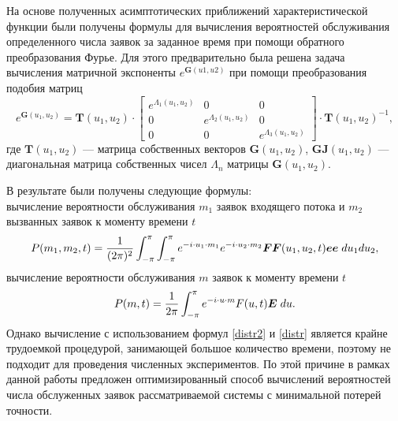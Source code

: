 На основе полученных асимптотических приближений характеристической функции были получены формулы для вычисления вероятностей обслуживания определенного числа заявок за заданное время при помощи обратного преобразования Фурье. Для этого предварительно была решена задача вычисления матричной экспоненты $e^{\boldsymbol{G}(u1,u2)}$ при помощи преобразования подобия матриц \cite{bronson1991matrix}
\begin{equation*}
	e^{\boldsymbol{G}(u_{1},u_{2})}=\boldsymbol{T}(u_{1},u_{2})\cdot \begin{bmatrix}
		e^{ \Lambda_{1}(u_{1},u_{2})} & 0 &  0\\
		0 & e^{ \Lambda_{2}(u_{1},u_{2})} & 0\\
		0 & 0 &	e^{ \Lambda_{3}(u_{1},u_{2})}
	\end{bmatrix} \cdot \boldsymbol{T}(u_{1},u_{2})^{-1},
\end{equation*}
где $\boldsymbol{T}(u_{1},u_{2})$ --- матрица собственных векторов $\boldsymbol{G}(u_{1},u_{2})$, $\boldsymbol{GJ}(u_{1},u_{2})$ --- диагональная матрица собственных чисел $\Lambda_{n}$ матрицы $\boldsymbol{G}(u_{1},u_{2})$.

В результате были получены следующие формулы:\\
вычисление вероятности обслуживания $m_1$ заявок входящего потока и $m_2$ вызванных заявок к моменту времени $t$
	\begin{equation}\label{distr2}
		P(m_{1},m_{2},t) = \dfrac{1}{(2\pi)^2}\int_{-\pi}^{\pi}\int_{-\pi}^{\pi} e^{-i \cdot u_{1} \cdot m_{1}} e^{-i \cdot u_{2} \cdot m_{2}}\boldsymbol{FF}(u_{1},u_{2},t)\boldsymbol{ee}\hspace{1mm}du_{1}du_{2},
	\end{equation}
вычисление вероятности обслуживания $m$ заявок к моменту времени $t$
\begin{equation}\label{distr}
	P(m,t) = \dfrac{1}{2\pi}\int_{-\pi}^{\pi} e^{-i \cdot u \cdot m} F(u,t)\boldsymbol{E}\hspace{1mm}du.
\end{equation}
Однако вычисление с использованием формул \eqref{distr2} и \eqref{distr} является крайне трудоемкой процедурой, занимающей большое количество времени, поэтому не подходит для проведения численных экспериментов. По этой причине в рамках данной работы предложен оптимизированный способ вычислений вероятностей числа обслуженных заявок рассматриваемой системы с минимальной потерей точности.
\clearpage
